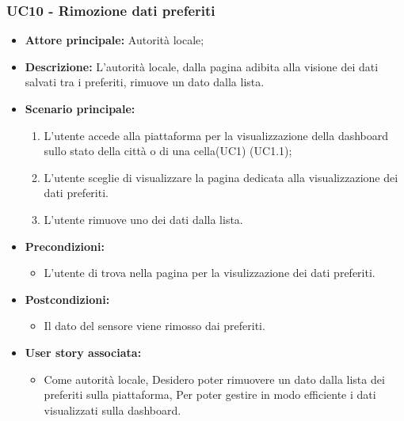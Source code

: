 \documentclass{article}
\begin{document}
\subsubsection{UC10 - Rimozione dati preferiti}
\begin{itemize}
    \item \textbf{Attore principale:} Autorità locale;
    \item \textbf{Descrizione:} L’autorità locale, dalla pagina adibita alla visione dei dati salvati tra i preferiti, rimuove un dato dalla lista.
    \item \textbf{Scenario principale:}
          \begin{enumerate}
              \item L'utente accede alla piattaforma per la visualizzazione della dashboard sullo stato della città o di una cella(UC1) (UC1.1);
              \item L'utente sceglie di visualizzare la pagina dedicata alla visualizzazione dei dati preferiti.
              \item L'utente rimuove uno dei dati dalla lista.
          \end{enumerate}
    \item \textbf{Precondizioni:}
          \begin{itemize}
              \item  L'utente di trova nella pagina per la visulizzazione dei dati preferiti.
          \end{itemize}
    \item \textbf{Postcondizioni:}
          \begin{itemize}
              \item  Il dato del sensore viene rimosso dai preferiti.
          \end{itemize}
    \item \textbf{User story associata:}
          \begin{itemize}
              \item Come autorità locale,
                    Desidero poter rimuovere un dato dalla lista dei preferiti sulla piattaforma,
                    Per poter gestire in modo efficiente i dati visualizzati sulla dashboard.
          \end{itemize}
\end{itemize}

\setcounter{rowcounter}{1}
\end{document}
